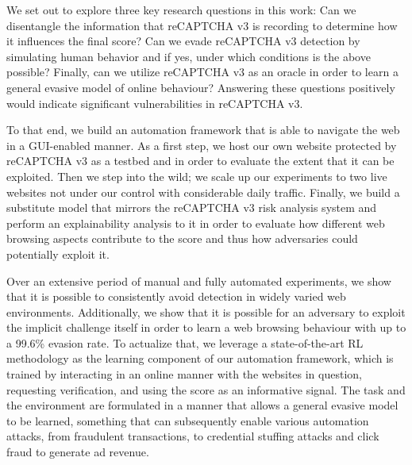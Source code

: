We set out to explore three key research questions in this work:
Can we disentangle the information that reCAPTCHA v3 is recording to determine how it influences the final score?
Can we evade reCAPTCHA v3 detection by simulating human behavior and if yes, under which conditions is the above possible?
Finally, can we utilize reCAPTCHA v3 as an oracle in order to learn a general evasive model of online behaviour?
Answering these questions positively would indicate significant vulnerabilities in reCAPTCHA v3.

To that end, we build an automation framework that is able to navigate the web in a GUI-enabled manner.
As a first step, we host our own website protected by reCAPTCHA v3 as a testbed and in order to evaluate the extent that it can be exploited.
Then we step into the wild; we scale up our experiments to two live websites not under our control with considerable daily traffic.
Finally, we build a substitute model that mirrors the reCAPTCHA v3 risk analysis system and perform an explainability analysis to it in order to evaluate how different web browsing aspects contribute to the score and thus how adversaries could potentially exploit it.

Over an extensive period of manual and fully automated experiments, we show that it is possible to consistently avoid detection in widely varied web environments.
Additionally, we show that it is possible for an adversary to exploit the implicit challenge itself in order to learn a web browsing behaviour with up to a 99.6\% evasion rate.
To actualize that, we leverage a state-of-the-art \gls{RL} methodology as the learning component of our automation framework, which is trained by interacting in an online manner with the websites in question, requesting verification, and using the score as an informative signal.
The task and the environment are formulated in a manner that allows a general evasive model to be learned, something that can subsequently enable various automation attacks, from fraudulent transactions, to credential stuffing attacks and click fraud to generate ad revenue.

